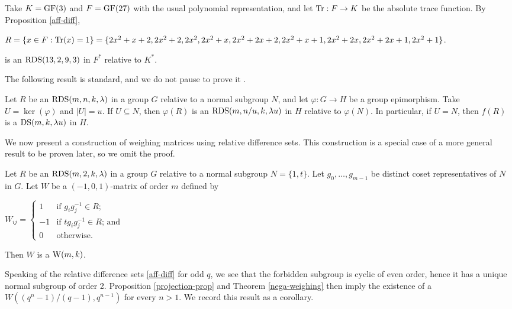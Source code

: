 \documentclass[../../../main]{subfiles}
\begin{document}
 \begin{ex}\label{aff-diff-ex}
  Take $K=\text{GF}(3)$ and $F=\text{GF}(27)$ with the usual polynomial representation, and let $\text{Tr} : F \rightarrow K$ be the absolute trace function. By Proposition \ref{aff-diff},
  \begin{defenum}
   \item\label{aff-diff-ex-R} $R=\{x \in F : \text{Tr}(x)=1\}=\{2x^2+x+2,2x^2+2,2x^2,2x^2+x,2x^2+2x+2,2x^2+x+1,2x^2+2x,2x^2+2x+1,2x^2+1\}$.
  \end{defenum}
  is an $\text{RDS}(13,2,9,3)$ in $F^*$ relative to $K^*$.
 \end{ex}
 
 The following result is standard, and we do not pause to prove it \cite[see][]{butson-rel-diff-set}.
 
 \begin{prop}\label{projection-prop}
  Let $R$ be an $\text{RDS}(m,n,k,\lambda)$ in a group $G$ relative to a normal subgroup $N$, and let $\varphi : G \rightarrow H$ be a group epimorphism. Take $U=\ker(\varphi)$ and $|U|=u$. If $U \subseteq N$, then $\varphi(R)$ is an $\text{RDS}(m,n/u,k,\lambda u)$ in $H$ relative to $\varphi(N)$. In particular, if $U=N$, then $f(R)$ is a $\text{DS}(m,k,\lambda u)$ in $H$.
 \end{prop}
 
 We now present a construction of weighing matrices using relative difference sets. This construction is a special case of a more general result to be proven later, so we omit the proof.
 
 \begin{thm}\label{nega-weighing}
  Let $R$ be an $\text{RDS}(m,2,k,\lambda)$ in a group $G$ relative to a normal subgroup $N=\{1,t\}$. Let $g_0, \dots, g_{m-1}$ be distinct coset representatives of $N$ in $G$. Let $W$ be a $(-1,0,1)$-matrix of order $m$ defined by
  \begin{defenum}
   \item\label{nega-weighing2} $W_{ij}=\begin{cases}
           1 & \text{if } g_ig_j^{-1} \in R; \\
           -1 & \text{if } tg_ig_j^{-1} \in R \text{; and} \\
           0 & \text{otherwise.}
          \end{cases}$
  \end{defenum}
  Then $W$ is a $\text{W}(m,k)$.
 \end{thm}
 
 Speaking of the relative difference sets \ref{aff-diff} for odd $q$, we see that the forbidden subgroup is cyclic of even order, hence it has a unique normal subgroup of order 2. Proposition \ref{projection-prop} and Theorem \ref{nega-weighing} then imply the existence of a $W((q^n-1)/(q-1),q^{n-1})$ for every $n>1$. We record this result as a corollary.
 
\end{document}
